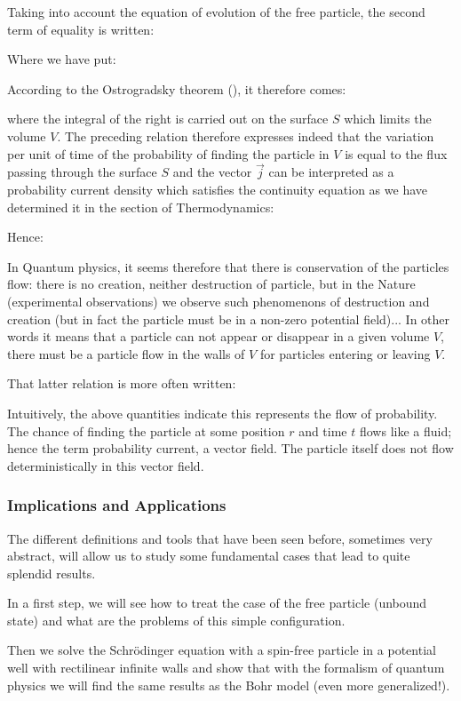 	Taking into account the equation of evolution of the free particle, the second term of equality is written:
	
	Where we have put:
	
	According to the Ostrogradsky theorem (), it therefore comes:
	
	where the integral of the right is carried out on the surface $S$ which limits the volume $V$. The preceding relation therefore expresses indeed that the variation per unit of time of the probability of finding the particle in $V$ is equal to the flux passing through the surface $S$ and the vector $\vec{j}$ can be interpreted as a probability current density which satisfies the continuity equation as we have determined it in the section of Thermodynamics:
	
	Hence:
	
	In Quantum physics, it seems therefore that there is conservation of the particles flow: there is no creation, neither destruction of particle, but in the Nature (experimental observations) we observe such phenomenons of destruction and creation (but in fact the particle must be in a non-zero potential field)... In other words it means that a particle can not appear or disappear in a given volume $V$, there must be a particle flow in the walls of $V$ for particles entering or leaving $V$.
	
	That latter relation is more often written:
	
	Intuitively, the above quantities indicate this represents the flow of probability. The chance of finding the particle at some position $r$ and time $t$ flows like a fluid; hence the term probability current, a vector field. The particle itself does not flow deterministically in this vector field.
	
	\subsubsection{Implications and Applications}
	The different definitions and tools that have been seen before, sometimes very abstract, will allow us to study some fundamental cases that lead to quite splendid results.

	In a first step, we will see how to treat the case of the free particle (unbound state) and what are the problems of this simple configuration.

	Then we solve the Schrödinger equation with a spin-free particle in a potential well with rectilinear infinite walls and show that with the formalism of quantum physics we will find the same results as the Bohr model (even more generalized!).

